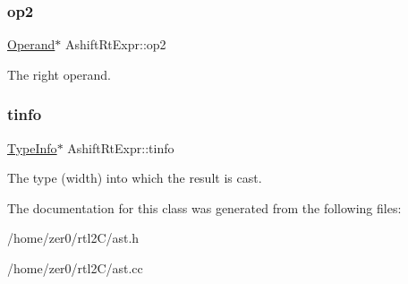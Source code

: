 \subsubsection{\texorpdfstring{op2}{op2}}
{\footnotesize\ttfamily \hyperlink{class_operand}{Operand}$\ast$ Ashift\+Rt\+Expr\+::op2\hspace{0.3cm}{\ttfamily [protected]}}

The right operand. \mbox{\label{class_ashift_rt_expr_a553f113d3c2b9dae1165a0b9852dc99a}} 
\subsubsection{\texorpdfstring{tinfo}{tinfo}}
{\footnotesize\ttfamily \hyperlink{class_type_info}{Type\+Info}$\ast$ Ashift\+Rt\+Expr\+::tinfo\hspace{0.3cm}{\ttfamily [protected]}}

The type (width) into which the result is cast. 

The documentation for this class was generated from the following files\+:\begin{DoxyCompactItemize}
\item 
/home/zer0/rtl2\+C/ast.\+h\item 
/home/zer0/rtl2\+C/ast.\+cc\end{DoxyCompactItemize}
